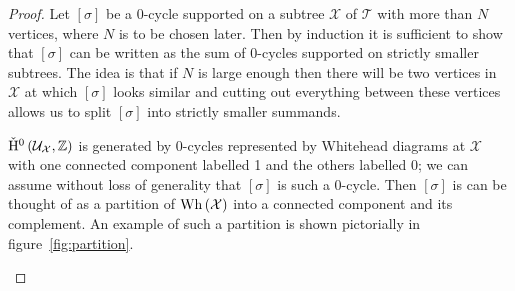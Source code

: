 \begin{proof} Let $\left[\sigma\right]$ be a 0-cycle supported on a subtree
$\mathcal{X}$ of $\mathcal{T}$ with more than $N$ vertices, where $N$
is to be chosen later. Then by induction it is sufficient to show that
$\left[\sigma\right]$ can be written as the sum of 0-cycles supported on
strictly smaller subtrees.  The idea is that if $N$ is large enough then
there will be two vertices in $\mathcal{X}$ at which $\left[\sigma\right]$
looks similar and cutting out everything between these vertices allows us to
split $\left[\sigma\right]$ into strictly smaller summands.

$\check{\mathrm{H}}{}^0\left(\mathcal{U}_\mathcal{X}, \mathbb{Z}\right)$ is generated by
0-cycles represented by Whitehead diagrams at $\mathcal{X}$ with one connected component
labelled 1 and the others labelled 0; we can assume without loss of generality
that $\left[\sigma\right]$ is such a 0-cycle. Then $\left[\sigma\right]$ is
can be thought of as a partition of $\mathrm{Wh}\left(\mathcal{X}\right)$ into a connected component
and its complement. An example of such a partition is shown pictorially in
figure~\ref{fig:partition}.

\begin{figure}
\centering

\end{figure}
\end{proof}
